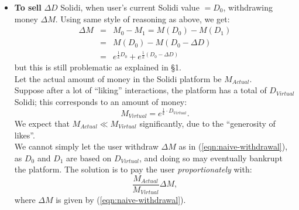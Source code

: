 \begin{itemize}
	\item \textbf{To sell} $\Delta D$ Solidi, when user's current Solidi value $= D_0$, withdrawing money $\Delta M$.  Using same style of reasoning as above, we get:
 		\begin{eqnarray}
 			\label{eqn:naive-withdrawal}
			\Delta M &=& M_0 - M_1 = M(D_0) - M(D_1) \nonumber \\
			&=& M(D_0) - M(D_0 - \Delta D) \nonumber \\
			&=& e^{\frac{1}{k} D_0} + e^{\frac{1}{k} (D_0 - \Delta D)}
		\end{eqnarray}
	but this is still problematic as explained in \S1. \\
	Let the actual amount of money in the Solidi platform be $M_{Actual}$. \\
	Suppose after a lot of ``liking'' interactions, the platform has a total of $D_{Virtual}$ Solidi;  this corresponds to an amount of money:
	\begin{equation}
		M_{Virtual} = e^{\frac{1}{k} \cdot D_{Virtual}} .
	\end{equation}
	We expect that $M_{Actual} \ll M_{Virtual}$ significantly, due to the ``generosity of likes''. \\
	We cannot simply let the user withdraw $\Delta M$ as in (\ref{eqn:naive-withdrawal}), as $D_0$ and $D_1$ are based on $D_{Virtual}$, and doing so may eventually bankrupt the platform.  The solution is to pay the user \textit{proportionately} with:
	\begin{equation}
		\frac{M_{Actual}}{M_{Virtual}} \Delta M ,
	\end{equation}
	where $\Delta M$ is given by (\ref{eqn:naive-withdrawal}).


\end{itemize}

\section{}


